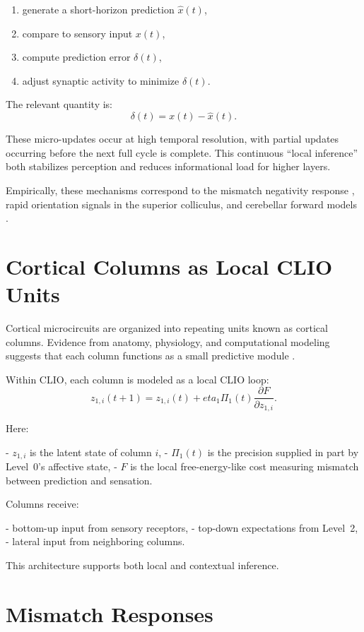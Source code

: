 \documentclass[12pt,oneside]{book}
\theoremstyle{plain}
\theoremstyle{definition}
\let\citep\parencite
\def\eta{eta}%
\begin{document}
\begin{enumerate}
  \item generate a short-horizon prediction $\hat{x}(t)$,
  \item compare to sensory input $x(t)$,
  \item compute prediction error $\delta(t)$,
  \item adjust synaptic activity to minimize $\delta(t)$.
\end{enumerate}

The relevant quantity is:
\[
\delta(t) = x(t) - \hat{x}(t).
\]

These micro-updates occur at high temporal resolution, with partial
updates occurring before the next full cycle is complete.
This continuous “local inference” both stabilizes perception and reduces
informational load for higher layers.

Empirically, these mechanisms correspond to the mismatch negativity
response \citep{n2001mismatch,bendixen2014update}, rapid orientation
signals in the superior colliculus, and cerebellar forward models
\citep{kawato1999internal}.

\section{Cortical Columns as Local CLIO Units}

Cortical microcircuits are organized into repeating units known as
cortical columns.
Evidence from anatomy, physiology, and computational modeling suggests
that each column functions as a small predictive module
\citep{mountcastle1997column,douglas2004neuronal}.

Within CLIO, each column is modeled as a local CLIO loop:
\[
z_{1,i}(t+1) = z_{1,i}(t)
   + \eta_{1} \Pi_{1}(t)
   \frac{\partial F}{\partial z_{1,i}}.
\]

Here:

- $z_{1,i}$ is the latent state of column $i$,
- $\Pi_{1}(t)$ is the precision supplied in part by Level~0’s affective
  state,
- $F$ is the local free-energy-like cost measuring mismatch between
  prediction and sensation.

Columns receive:

- bottom-up input from sensory receptors,
- top-down expectations from Level~2,
- lateral input from neighboring columns.

This architecture supports both local and contextual inference.

\section{Mismatch Responses}
\end{document}
